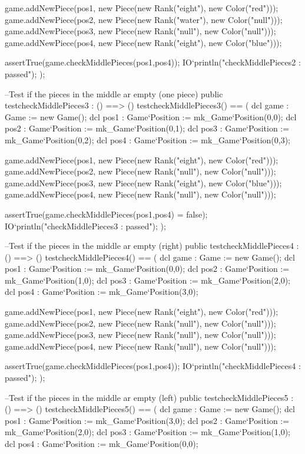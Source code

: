 \begin{vdm_al}
    game.addNewPiece(pos1, new Piece(new Rank("eight"), new Color("red")));
    game.addNewPiece(pos2, new Piece(new Rank("water"), new Color("null")));
    game.addNewPiece(pos3, new Piece(new Rank("null"), new Color("null")));
    game.addNewPiece(pos4, new Piece(new Rank("eight"), new Color("blue")));
    
    assertTrue(game.checkMiddlePieces(pos1,pos4));
    IO`println("checkMiddlePieces2 : passed");
   );
  
  --Test if the pieces in the middle ar empty (one piece)
  public testcheckMiddlePieces3 : () ==> ()
   testcheckMiddlePieces3() ==
   (
    dcl game : Game := new Game();
    dcl pos1 : Game`Position := mk_Game`Position(0,0);
    dcl pos2 : Game`Position := mk_Game`Position(0,1);
    dcl pos3 : Game`Position := mk_Game`Position(0,2);
    dcl pos4 : Game`Position := mk_Game`Position(0,3);
    
    game.addNewPiece(pos1, new Piece(new Rank("eight"), new Color("red")));
    game.addNewPiece(pos2, new Piece(new Rank("null"), new Color("null")));
    game.addNewPiece(pos3, new Piece(new Rank("eight"), new Color("blue")));
    game.addNewPiece(pos4, new Piece(new Rank("null"), new Color("null")));
    
    assertTrue(game.checkMiddlePieces(pos1,pos4) = false);
    IO`println("checkMiddlePieces3 : passed");
   );
   
  --Test if the pieces in the middle ar empty (right)
  public testcheckMiddlePieces4 : () ==> ()
   testcheckMiddlePieces4() ==
   (
    dcl game : Game := new Game();
    dcl pos1 : Game`Position := mk_Game`Position(0,0);
    dcl pos2 : Game`Position := mk_Game`Position(1,0);
    dcl pos3 : Game`Position := mk_Game`Position(2,0);
    dcl pos4 : Game`Position := mk_Game`Position(3,0);
    
    game.addNewPiece(pos1, new Piece(new Rank("eight"), new Color("red")));
    game.addNewPiece(pos2, new Piece(new Rank("null"), new Color("null")));
    game.addNewPiece(pos3, new Piece(new Rank("null"), new Color("null")));
    game.addNewPiece(pos4, new Piece(new Rank("null"), new Color("null")));
    
    assertTrue(game.checkMiddlePieces(pos1,pos4));
    IO`println("checkMiddlePieces4 : passed");
   );
   
  --Test if the pieces in the middle ar empty (left)
  public testcheckMiddlePieces5 : () ==> ()
   testcheckMiddlePieces5() ==
   (
    dcl game : Game := new Game();
    dcl pos1 : Game`Position := mk_Game`Position(3,0);
    dcl pos2 : Game`Position := mk_Game`Position(2,0);
    dcl pos3 : Game`Position := mk_Game`Position(1,0);
    dcl pos4 : Game`Position := mk_Game`Position(0,0);
    

\end{vdm_al}
